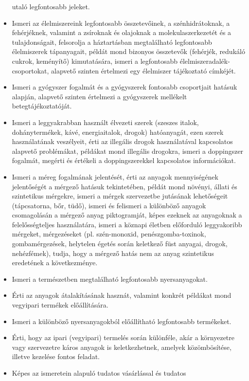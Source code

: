 \begin{itemize}
  utaló legfontosabb jeleket.
\item
  Ismeri az élelmiszereink legfontosabb összetevőinek, a
  szénhidrátoknak, a fehérjéknek, valamint a zsíroknak és olajoknak a
  molekulaszerkezetét és a tulajdonságait, felsorolja a háztartásban
  megtalálható legfontosabb élelmiszerek tápanyagait, példát mond
  bizonyos összetevők (fehérjék, redukáló cukrok, keményítő)
  kimutatására, ismeri a legfontosabb élelmiszeradalék-csoportokat,
  alapvető szinten értelmezi egy élelmiszer tájékoztató címkéjét.
\item
  Ismeri a gyógyszer fogalmát és a gyógyszerek fontosabb csoportjait
  hatásuk alapján, alapvető szinten értelmezi a gyógyszerek mellékelt
  betegtájékoztatóját.
\item
  Ismeri a leggyakrabban használt élvezeti szerek (szeszes italok,
  dohánytermékek, kávé, energiaitalok, drogok) hatóanyagát, ezen szerek
  használatának veszélyeit, érti az illegális drogok használatával
  kapcsolatos alapvető problémákat, példákat mond illegális drogokra,
  ismeri a doppingszer fogalmát, megérti és értékeli a doppingszerekkel
  kapcsolatos információkat.
\item
  Ismeri a méreg fogalmának jelentését, érti az anyagok mennyiségének
  jelentőségét a mérgező hatásuk tekintetében, példát mond növényi,
  állati és szintetikus mérgekre, ismeri a mérgek szervezetbe jutásának
  lehetőségeit (tápcsatorna, bőr, tüdő), ismeri és felismeri a különböző
  anyagok csomagolásán a mérgező anyag piktogramját, képes ezeknek az
  anyagoknak a felelősségteljes használatára, ismeri a köznapi életben
  előforduló leggyakoribb mérgeket, mérgezéseket (pl. szén-monoxid,
  penészgomba-toxinok, gombamérgezések, helytelen égetés során keletkező
  füst anyagai, drogok, nehézfémek), tudja, hogy a mérgező hatás nem az
  anyag szintetikus eredetének a következménye.
\item
  Ismeri a természetben megtalálható legfontosabb nyersanyagokat.
\item
  Érti az anyagok átalakításának hasznát, valamint konkrét példákat mond
  vegyipari termékek előállítására.
\item
  Ismeri a különböző nyersanyagokból előállítható legfontosabb
  termékeket.
\item
  Érti, hogy az ipari (vegyipari) termelés során különféle, akár a
  környezetre vagy szervezetre káros anyagok is keletkezhetnek, amelyek
  közömbösítése, illetve kezelése fontos feladat.
\item
  Képes az ismeretein alapuló tudatos vásárlással és tudatos

\end{itemize}

